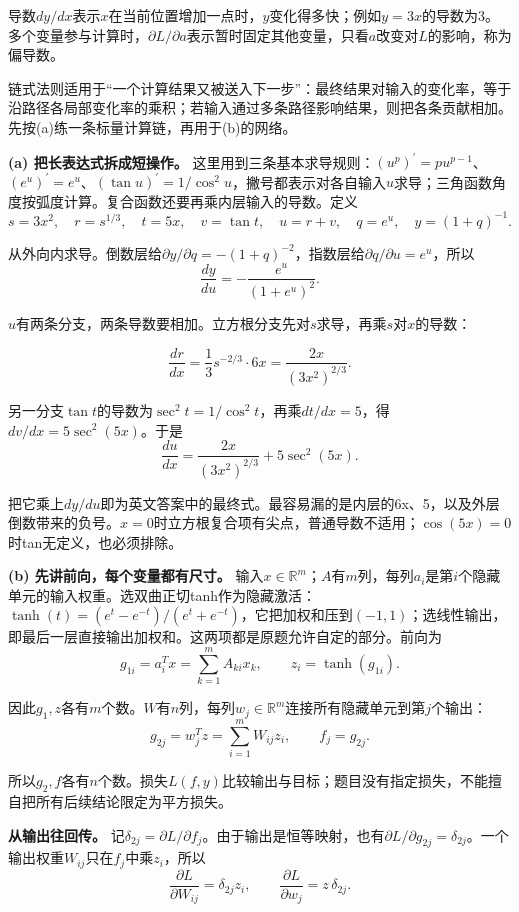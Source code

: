 导数\(dy/dx\)表示\(x\)在当前位置增加一点时，\(y\)变化得多快；例如\(y=3x\)的导数为3。多个变量参与计算时，\(\partial L/\partial a\)表示暂时固定其他变量，只看\(a\)改变对\(L\)的影响，称为偏导数。


链式法则适用于“一个计算结果又被送入下一步”：最终结果对输入的变化率，等于沿路径各局部变化率的乘积；若输入通过多条路径影响结果，则把各条贡献相加。先按(a)练一条标量计算链，再用于(b)的网络。


\textbf{(a) 把长表达式拆成短操作。} 这里用到三条基本求导规则：\((u^p)^{\prime}=pu^{p-1}\)、\((e^u)^{\prime}=e^u\)、\((\tan u)^{\prime}=1/\cos^2u\)，撇号都表示对各自输入\(u\)求导；三角函数角度按弧度计算。复合函数还要再乘内层输入的导数。定义
\[
s=3x^2,\quad r=s^{1/3},\quad t=5x,\quad v=\tan t,
\quad u=r+v,\quad q=e^u,\quad y=(1+q)^{-1}.
\]


从外向内求导。倒数层给\(\partial y/\partial q=-(1+q)^{-2}\)，指数层给\(\partial q/\partial u=e^u\)，所以
\[
\frac{dy}{du}=-\frac{e^u}{(1+e^u)^2}.
\]


\(u\)有两条分支，两条导数要相加。立方根分支先对\(s\)求导，再乘\(s\)对\(x\)的导数：



\[
\frac{dr}{dx}=\frac13s^{-2/3}\cdot6x
=\frac{2x}{(3x^2)^{2/3}}.
\]


另一分支\(\tan t\)的导数为\(\sec^2t=1/\cos^2t\)，再乘\(dt/dx=5\)，得\(dv/dx=5\sec^2(5x)\)。于是
\[
\frac{du}{dx}=\frac{2x}{(3x^2)^{2/3}}+5\sec^2(5x).
\]


把它乘上\(dy/du\)即为英文答案中的最终式。最容易漏的是内层的6x、5，以及外层倒数带来的负号。\(x=0\)时立方根复合项有尖点，普通导数不适用；\(\cos(5x)=0\)时tan无定义，也必须排除。


\textbf{(b) 先讲前向，每个变量都有尺寸。} 输入\(x\in\mathbb R^m\)；\(A\)有\(m\)列，每列\(a_i\)是第\(i\)个隐藏单元的输入权重。选双曲正切tanh作为隐藏激活：\(\tanh(t)=(e^t-e^{-t})/(e^t+e^{-t})\)，它把加权和压到\((-1,1)\)；选线性输出，即最后一层直接输出加权和。这两项都是原题允许自定的部分。前向为
\[
g_{1i}=a_i^Tx=\sum_{k=1}^m A_{ki}x_k,\qquad z_i=\tanh(g_{1i}).
\]


因此\(g_1,z\)各有\(m\)个数。\(W\)有\(n\)列，每列\(w_j\in\mathbb R^m\)连接所有隐藏单元到第\(j\)个输出：
\[
g_{2j}=w_j^Tz=\sum_{i=1}^m W_{ij}z_i,\qquad f_j=g_{2j}.
\]


所以\(g_2,f\)各有\(n\)个数。损失\(L(f,y)\)比较输出与目标；题目没有指定损失，不能擅自把所有后续结论限定为平方损失。


\textbf{从输出往回传。} 记\(\delta_{2j}=\partial L/\partial f_j\)。由于输出是恒等映射，也有\(\partial L/\partial g_{2j}=\delta_{2j}\)。一个输出权重\(W_{ij}\)只在\(f_j\)中乘\(z_i\)，所以
\[
\frac{\partial L}{\partial W_{ij}}=\delta_{2j}z_i,
\qquad \frac{\partial L}{\partial w_j}=z\,\delta_{2j}.
\]


